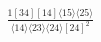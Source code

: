 \documentclass[varwidth, border=5pt]{standalone}
\begin{document}
\begin{my}
$\begin{gathered}
\scriptscriptstyle\frac{1[34][14]⟨15⟩⟨25⟩}{⟨14⟩⟨23⟩⟨24⟩[24]^2}
\end{gathered}$
\end{my}
\end{document}
